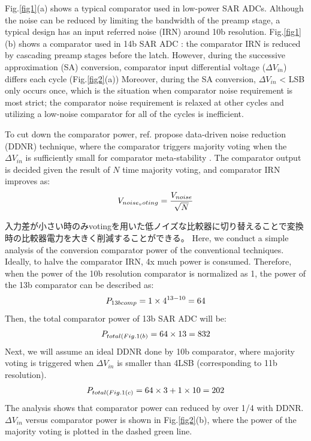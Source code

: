 \documentclass[letterpaper, 10 pt, conference]{ieeeconf}  %
\begin{document}
Fig.\ref{fig1}(a) shows a typical comparator\cite{miyahara2008low} used in low-power SAR ADCs. Although the noise can be reduced by limiting the bandwidth of the preamp stage, a typical design has an input referred noise (IRN) around 10b resolution. Fig.\ref{fig1}(b) shows a comparator used in 14b SAR ADC \cite{hesener200714b}: the comparator IRN is reduced by cascading preamp stages before the latch. However, during the successive approximation (SA) conversion, comparator input differential voltage ($\Delta V_{in}$) differs each cycle (Fig.\ref{fig2}(a)) Moreover, during the SA conversion, $\Delta V_{in}$ < LSB only occurs once, which is the situation when comparator noise requirement is most strict; the comparator noise requirement is relaxed at other cycles and utilizing a low-noise comparator for all of the cycles is inefficient. 

To cut down the comparator power, ref.\cite{harpe201310b} propose data-driven noise reduction (DDNR) technique, where the comparator triggers majority voting when the $\Delta V_{in}$ is sufficiently small for comparator meta-stability \cite{shikata20120}. The comparator output is decided given the result of $N$ time majority voting, and comparator IRN improves as:
\begin{eqnarray}
    \centering
    V_{noise_voting} = \frac{V_{noise}}{\sqrt{N}}
    \label{voting}
\end{eqnarray}

入力差が小さい時のみvotingを用いた低ノイズな比較器に切り替えることで変換時の比較器電力を大きく削減することができる。
Here, we conduct a simple analysis of the conversion comparator power of the conventional techniques. Ideally, to halve the comparator IRN, 4x much power is consumed. Therefore, when the power of the 10b resolution comparator is normalized as 1, the power of the 13b comparator can be described as:
\begin{eqnarray}
    \centering
    P_{13bcomp} = 1 \times 4^{13-10} = 64
    \label{13b}
\end{eqnarray}
Then, the total comparator power of 13b SAR ADC will be:
\begin{eqnarray}
    \centering
    P_{total(Fig.1(b)} = 64 \times 13 = 832
    \label{sar13b}
\end{eqnarray}
Next, we will assume an ideal DDNR done by 10b comparator, where majority voting is triggered when $\Delta V_{in}$ is smaller than 4LSB (corresponding to 11b resolution).
\begin{eqnarray}
    \centering
    P_{total(Fig.1(c)} = 64 \times 3 + 1 \times 10 = 202
    \label{ddnr}
\end{eqnarray}
The analysis shows that comparator power can reduced by over 1/4 with DDNR. $\Delta V_{in}$ versus comparator power is shown in Fig.\ref{fig2}(b), where the power of the majority voting is plotted in the dashed green line. 
\end{document}
